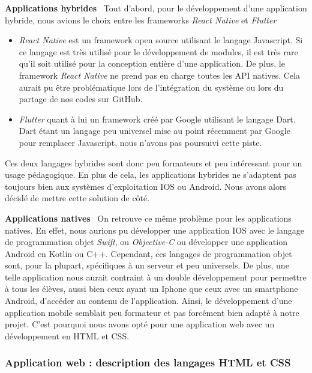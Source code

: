 \documentclass[oneside,a4paper,13pt]{article}
\begin{document}
\textbf{Applications hybrides}
\newline
\
Tout d’abord, pour le développement d’une application hybride, nous avions le choix entre les frameworks \textit{React Native} et \textit{Flutter} 
\begin{itemize}
    \item \textit{React Native} est un framework open source utilisant le langage Javascript. Si ce langage est très utilisé pour le développement de modules, il est très rare qu’il soit utilisé pour la conception entière d’une application. De plus, le framework \textit{React Native} ne prend pas en charge toutes les API natives. Cela aurait pu être problématique lors de l’intégration du système ou lors du partage de nos codes sur GitHub. 
    \smallbreak
    \item \textit{Flutter} quant à lui un framework créé par Google utilisant le langage Dart. Dart étant un langage peu universel mise au point récemment par Google pour remplacer Javascript, nous n’avons pas poursuivi cette piste. 
\end{itemize}
\smallbreak
Ces deux langages hybrides sont donc peu formateurs et peu intéressant pour un usage pédagogique. En plus de cela, les applications hybrides ne s’adaptent pas toujours bien aux systèmes d’exploitation IOS ou Android. Nous avons alors décidé de mettre cette solution de côté. 

\bigbreak 
\textbf{Applications natives}
\newline
\
On retrouve ce même problème pour les applications natives. En effet, nous aurions pu développer une application IOS avec le langage de programmation objet \textit{Swift}, ou \textit{Objective-C} ou développer une application Android en Kotlin ou C++. Cependant, ces langages de programmation objet sont,  pour la plupart, spécifiques à un serveur et peu universels. De plus, une telle application nous aurait contraint à un double développement pour permettre à tous les élèves, aussi bien ceux ayant un Iphone que ceux avec un smartphone Android, d’accéder au contenu de l’application. 
\smallbreak
Ainsi, le développement d’une application mobile semblait peu formateur et pas forcément bien adapté à notre projet.  C’est pourquoi nous avons opté pour une application web avec un développement en HTML et CSS. 


\subsubsection{Application web : description des langages HTML et CSS}
\end{document}
